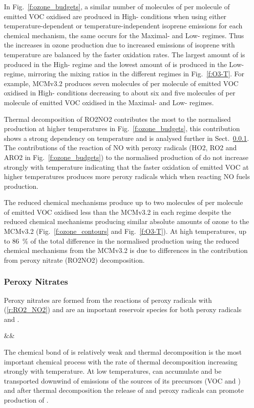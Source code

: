 In Fig.~\ref{f:ozone_budgets}, a similar number of molecules of  per molecule of emitted VOC oxidised are produced in High- conditions when using either temperature-dependent or temperature-independent isoprene emissions for each chemical mechanism, the same occurs for the Maximal- and Low- regimes.
Thus the increases in ozone production due to increased emissions of isoprene with temperature are balanced by the faster oxidation rates.
The largest amount of  is produced in the High- regime and the lowest amount of  is produced in the Low- regime, mirroring the  mixing ratios in the different  regimes in Fig.~\ref{f:O3-T}.
For example, MCMv3.2 produces seven molecules of  per molecule of emitted VOC oxidised in High- conditions decreasing to about six and five molecules of  per molecule of emitted VOC oxidised in the Maximal- and Low- regimes.

Thermal decomposition of RO2NO2 contributes the most to the normalised  production at higher temperatures in Fig.~\ref{f:ozone_budgets}, this contribution shows a strong dependency on temperature and is analysed further in Sect.~\ref{sss:ro2no2}.
The contributions of the reaction of NO with peroxy radicals (HO2, RO2 and ARO2 in Fig.~\ref{f:ozone_budgets}) to the normalised production of  do not increase strongly with temperature indicating that the faster oxidation of emitted VOC at higher temperatures produces more peroxy radicals which when reacting NO fuels  production.

The reduced chemical mechanisms produce up to two molecules of  per molecule of emitted VOC oxidised less than the MCMv3.2 in each  regime despite the reduced chemical mechanisms producing similar absolute amounts of ozone to the MCMv3.2 (Fig.~\ref{f:ozone_contours} and Fig.~\ref{f:O3-T}).
At high temperatures, up to $86$~\% of the total difference in the normalised  production using the reduced chemical mechanisms from the MCMv3.2 is due to differences in the contribution from peroxy nitrate (RO2NO2) decomposition.

\subsubsection{Peroxy Nitrates} \label{sss:ro2no2}
Peroxy nitrates are formed from the reactions of peroxy radicals with  (\ref{r:RO2_NO2}) and are an important reservoir species for both peroxy radicals and .
\begin{rxnarray}
    &&  \rightleftharpoons {} \label{r:RO2_NO2}
\end{rxnarray}
The chemical bond of  is relatively weak and thermal decomposition is the most important chemical process with the rate of thermal decomposition increasing strongly with temperature.
At low temperatures,  can accumulate and be transported downwind of emissions of the sources of its precursors (VOC and ) and after thermal decomposition the release of  and peroxy radicals can promote production of  \citep{Moxim:1996}.

